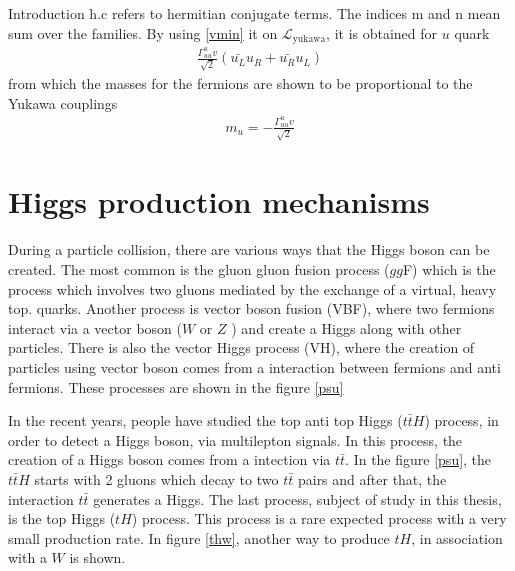 \begin{chapter}{Introduction}
{h.c refers to hermitian conjugate terms. } The indices m and n mean sum over the families. 
By using \ref{vmin} it on $\mathcal{L}_\text{yukawa}$, it is obtained for $u$ quark
\begin{align*}
\frac{\Gamma^u_{uu}v}{\sqrt{2}}(\bar{u_L}u_R+\bar{u_R}u_L)
\end{align*}
from which the masses for the fermions are shown to be proportional to the Yukawa couplings
\begin{align*}
m_u=-\frac{\Gamma^u_{uu}v}{\sqrt{2}}
\end{align*}
 
\pagebreak

\section{Higgs production mechanisms}
During a particle collision, there are various ways that the Higgs boson can be created. The most common is the gluon gluon fusion process ($gg$F) which is the process which involves two gluons mediated by the exchange of a virtual, heavy top.
quarks. Another process is vector boson fusion (VBF), where two fermions interact via a vector boson ($W$ or $Z$ ) and create a Higgs along with other particles. There is also the vector Higgs process (VH), where the creation of particles using vector boson comes from a interaction between fermions and anti fermions\cite{pd}. These processes are shown in the figure \ref{psu}

In the recent years, people have studied the top anti top Higgs ($t\bar{t}H$) process, in order to detect a Higgs boson, via multilepton signals\cite{th1}.
In this process, the creation of a Higgs boson comes from a intection via $t\bar{t}$. In the figure \ref{psu}, the $t\bar{t}H$ starts with 2 gluons which decay to two $t\bar{t}$ pairs and after that, the interaction $t\bar{t}$ generates a Higgs. The last process, subject of study in this thesis, is the top Higgs ($tH$) process. This process is a rare expected process with a very small production rate\cite{pd}. In figure \ref{thw}, another way to produce $tH$, in association with a $W$ is shown.


\end{chapter}
